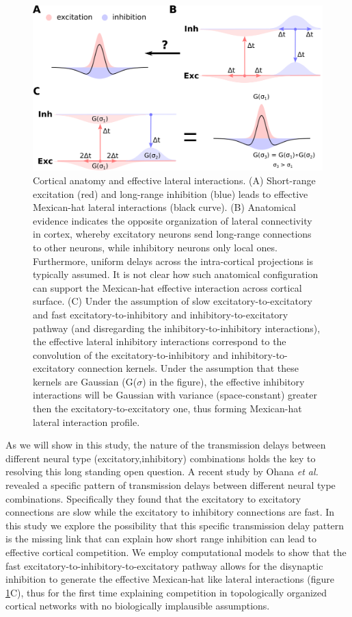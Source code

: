 \documentclass[utf8]{frontiersSCNS}
\newcommand{\etal}{\textit{et al.}}
\begin{document}
\begin{figure}[htpb!] 
\centering
\includegraphics[width=16cm]{./SVG/FigureLateralInteractions/drawing.png}
\caption{Cortical anatomy and effective lateral interactions. (A) Short-range excitation (red) and long-range inhibition (blue) leads to effective Mexican-hat lateral interactions (black curve). 
(B) Anatomical evidence indicates the opposite organization of lateral connectivity in cortex, whereby excitatory neurons send long-range connections to other neurons, while inhibitory neurons only 
local ones. Furthermore, uniform delays across the intra-cortical projections is typically assumed. It is not clear how such anatomical configuration can support the Mexican-hat effective interaction
across cortical surface. (C) Under the assumption of slow excitatory-to-excitatory and fast excitatory-to-inhibitory and inhibitory-to-excitatory pathway (and disregarding the inhibitory-to-inhibitory interactions), 
the effective lateral inhibitory interactions correspond to the convolution of the excitatory-to-inhibitory and inhibitory-to-excitatory connection kernels. Under the assumption that these kernels are Gaussian (G($\sigma$) in 
the figure), the effective inhibitory interactions will be Gaussian with variance (space-constant) greater then the excitatory-to-excitatory one, thus forming Mexican-hat lateral interaction profile.
}
\label{fig:lat_int}
\end{figure} 


As we will show in this study, the nature of the transmission delays between different neural type (excitatory,inhibitory) combinations
holds the key to resolving this long standing open question. A recent study by Ohana \etal\,\citep{Ohana2012} revealed a specific pattern of transmission delays between different neural type combinations. Specifically they found that the excitatory to excitatory connections are slow while the excitatory to inhibitory connections are fast. In this study we explore the 
possibility that this specific transmission delay pattern is the missing link that can explain how short range inhibition can lead 
to effective cortical competition. We employ computational models to show that the fast excitatory-to-inhibitory-to-excitatory pathway allows for the disynaptic inhibition to generate the effective Mexican-hat like lateral interactions (figure \ref{fig:lat_int}C), thus for the first time 
explaining competition in topologically organized cortical networks with no biologically implausible assumptions. 
\end{document}
